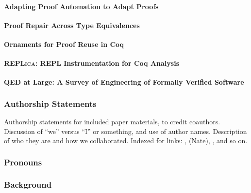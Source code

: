 \paragraph{Adapting Proof Automation to Adapt Proofs}

\paragraph{Proof Repair Across Type Equivalences}

\paragraph{Ornaments for Proof Reuse in Coq}

\paragraph{\textsc{REPLica}: REPL Instrumentation for Coq Analysis}

\paragraph{QED at Large: A Survey of Engineering of Formally Verified Software}

\subsubsection*{Authorship Statements}

Authorship statements for included paper materials, to credit coauthors. Discussion of ``we'' versus ``I'' or something, and use of author names.
Description of who they are and how we collaborated.
Indexed for links: ,  (Nate),
, and so on.

\subsubsection*{Pronouns}

\subsubsection*{Background}



